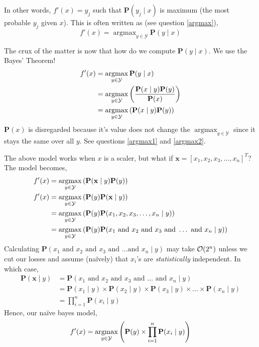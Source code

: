 \documentclass{homework}
\renewcommand\P{\mathbf{P}}
\newcommand\Y{\mathcal{Y}}
\DeclareMathOperator*{\argmax}{argmax}
\begin{document}
In other words, $f'(x) = y_j$ such that $\P(y_j \mid x)$ is maximum
(the most probable $y_j$ given $x$). This is often written as (see
question \ref{argmax}),
\[
  f'(x) = \argmax_{y\in \Y}\P(y\mid x)
\]

The crux of the matter is now that how do we compute $\P(y\mid x)$. We
use the Bayes' Theorem!
\begin{align*}
  f'(x) & = \argmax_{y\in \Y}\P(y\mid x)                             \\
        & = \argmax_{y\in \Y}\paren{\frac{\P(x \mid y)\P(y)}{\P(x)}} \\
        & = \argmax_{y\in \Y}\paren{\P(x \mid y)\P(y)}
\end{align*}
$\P(x)$ is disregarded because it's value does not change the
$\argmax_{y\in \Y}$ since it stays the same over all $y$. See
questions \ref{argmax1} and \ref{argmax2}.

The above model works when $x$ is a scaler, but what if
$\mathbf{x} = [x_1, x_2, x_3, \hdots, x_n]^T$? The model becomes,
\begin{align*}
  f'(x) & = \argmax_{y\in \Y}\paren{\P(\mathbf{x} \mid y)\P(y)} \\
  f'(x) & = \argmax_{y\in \Y}\paren{\P(y)\P(\mathbf{x} \mid y)} \\
        & = \argmax_{y\in \Y}\paren{\P(y)\P(
  x_1, x_2, x_3, \hdots, x_n \mid y)}                           \\
        & = \argmax_{y\in \Y}\paren{\P(y)\P(
    x_1 \text{ and }
    x_2 \text{ and }
    x_3 \text{ and }
    \hdots \text{ and }
    x_n \mid y
    )}
\end{align*}
Calculating
$\P(x_1 \text{ and } x_2 \text{ and } x_3 \text{ and } \hdots \text{
    and } x_n \mid y)$ may take $\mathcal{O}(2^n)$ unless we cut our losses and
assume (na\"ively) that $x_i$'s are \textit{statistically}
independent. In which case,
\begin{align*}
  \P(\mathbf{x}\mid y)
   & = \P(
  x_1 \text{ and }
  x_2 \text{ and }
  x_3 \text{ and }
  \hdots \text{ and }
  x_n \mid y)                      \\
   & = \P(x_1 \mid y) \times
  \P(x_2 \mid y) \times
  \P(x_3 \mid y) \times
  \hdots \times
  \P(x_n \mid y)                   \\
   & = \prod_{i=1}^n\P(x_i \mid y)
\end{align*}
Hence, our na\"ive bayes model,
\[
  f'(x) = \argmax_{y\in \Y}\paren{\P(y) \times \prod_{i=1}^n\P(x_i \mid y)}
\]
\end{document}
